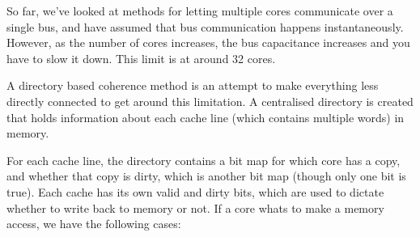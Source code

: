 So far, we've looked at methods for letting multiple cores communicate over a
single bus, and have assumed that bus communication happens instantaneously.
However, as the number of cores increases, the bus capacitance increases and you
have to slow it down. This limit is at around 32 cores.

A directory based coherence method is an attempt to make everything less
directly connected to get around this limitation. A centralised directory is
created that holds information about each cache line (which contains multiple
words) in memory.

For each cache line, the directory contains a bit map for which core has a copy,
and whether that copy is dirty, which is another bit map (though only one bit is
true). Each cache has its own valid and dirty bits, which are used to dictate
whether to write back to memory or not. If a core whats to make a memory access,
we have the following cases:

